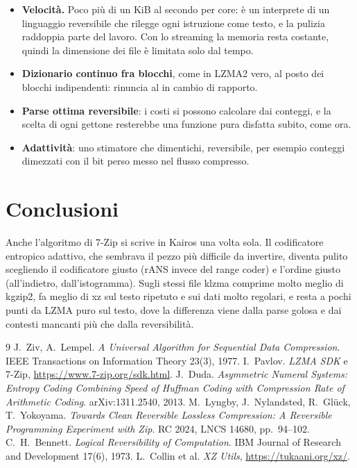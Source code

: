 \begin{itemize}
\item \textbf{Velocità.} Poco più di un KiB al secondo per core: è un interprete di un linguaggio reversibile che rilegge ogni istruzione come testo, e la pulizia raddoppia parte del lavoro. Con lo streaming la memoria resta costante, quindi la dimensione dei file è limitata solo dal tempo.
\item \textbf{Dizionario continuo fra blocchi}, come in LZMA2 vero, al posto dei blocchi indipendenti: rinuncia al  in cambio di rapporto.
\item \textbf{Parse ottima reversibile}: i costi si possono calcolare dai conteggi, e la scelta di ogni gettone resterebbe una funzione pura disfatta subito, come ora.
\item \textbf{Adattività}: uno stimatore che dimentichi, reversibile, per esempio conteggi dimezzati con il bit perso messo nel flusso compresso.
\end{itemize}

\section{Conclusioni}

Anche l'algoritmo di 7-Zip si scrive in Kairos una volta sola. Il codificatore entropico adattivo, che sembrava il pezzo più difficile da invertire, diventa pulito scegliendo il codificatore giusto (rANS invece del range coder) e l'ordine giusto (all'indietro, dall'istogramma). Sugli stessi file klzma comprime molto meglio di kgzip2, fa meglio di xz sul testo ripetuto e sui dati molto regolari, e resta a pochi punti da LZMA puro sul testo, dove la differenza viene dalla parse golosa e dai contesti mancanti più che dalla reversibilità.

\begin{thebibliography}{9}
 J.~Ziv, A.~Lempel. \emph{A Universal Algorithm for Sequential Data Compression}. IEEE Transactions on Information Theory 23(3), 1977.
 I.~Pavlov. \emph{LZMA SDK} e 7-Zip, \url{https://www.7-zip.org/sdk.html}.
 J.~Duda. \emph{Asymmetric Numeral Systems: Entropy Coding Combining Speed of Huffman Coding with Compression Rate of Arithmetic Coding}. arXiv:1311.2540, 2013.
 M.~Lyngby, J.~Nylandsted, R.~Glück, T.~Yokoyama. \emph{Towards Clean Reversible Lossless Compression: A Reversible Programming Experiment with Zip}. RC 2024, LNCS 14680, pp.~94--102.
 C.~H.~Bennett. \emph{Logical Reversibility of Computation}. IBM Journal of Research and Development 17(6), 1973.
 L.~Collin et al. \emph{XZ Utils}, \url{https://tukaani.org/xz/}.
\end{thebibliography}


